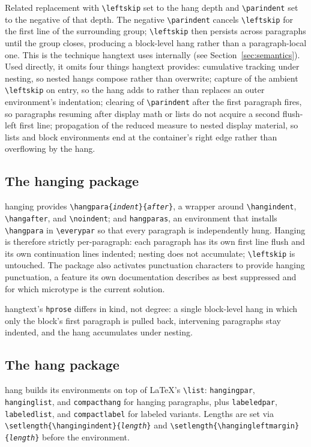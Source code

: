 \documentclass[11pt, twoside, openany]{article}
\newcommand{\pkg}[1]{\textsf{#1}}
\newcommand{\meta}[1]{\textit{\texttt{#1}}}
\newcommand{\env}[1]{\texttt{#1}}
\newcommand{\cs}[1]{\texttt{\textbackslash #1}}
\begin{document}
Related replacement with \cs{leftskip} set to the hang depth and \cs{parindent} set to the negative of that depth. The negative \cs{parindent} cancels \cs{leftskip} for the first line of the surrounding group; \cs{leftskip} then persists across paragraphs until the group closes, producing a block-level hang rather than a paragraph-local one. This is the technique \pkg{hangtext} uses internally (see Section~\ref{sec:semantics}). Used directly, it omits four things \pkg{hangtext} provides: cumulative tracking under nesting, so nested hangs compose rather than overwrite; capture of the ambient \cs{leftskip} on entry, so the hang adds to rather than replaces an outer environment's indentation; clearing of \cs{parindent} after the first paragraph fires, so paragraphs resuming after display math or lists do not acquire a second flush-left first line; propagation of the reduced measure to nested display material, so lists and block environments end at the container's right edge rather than overflowing by the hang.

\subsection{The \pkg{hanging} package}

\pkg{hanging} \cite{wilsonhanging} provides \cs{hangpara}\texttt{\{}\meta{indent}\texttt{\}\{}\meta{after}\texttt{\}}, a wrapper around \cs{hangindent}, \cs{hangafter}, and \cs{noindent}; and \env{hangparas}, an environment that installs \cs{hangpara} in \cs{everypar} so that every paragraph is independently hung. Hanging is therefore strictly per-paragraph: each paragraph has its own first line flush and its own continuation lines indented; nesting does not accumulate; \cs{leftskip} is untouched. The package also activates punctuation characters to provide hanging punctuation, a feature its own documentation describes as best suppressed and for which \pkg{microtype} is the current solution.

\pkg{hangtext}'s \env{hprose} differs in kind, not degree: a single block-level hang in which only the block's first paragraph is pulled back, intervening paragraphs stay indented, and the hang accumulates under nesting.

\subsection{The \pkg{hang} package}

\pkg{hang} \cite{noldahang} builds its environments on top of \LaTeX's \cs{list}: \env{hangingpar}, \env{hanginglist}, and \env{compacthang} for hanging paragraphs, plus \env{labeledpar}, \env{labeledlist}, and \env{compactlabel} for labeled variants. Lengths are set via \cs{setlength}\texttt{\{}\cs{hangingindent}\texttt{\}}\allowbreak\texttt{\{}\meta{length}\texttt{\}} and \cs{setlength}\texttt{\{}\cs{hangingleftmargin}\texttt{\}}\allowbreak\texttt{\{}\meta{length}\texttt{\}} before the environment.
\end{document}
